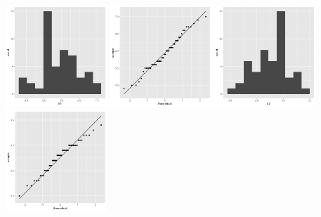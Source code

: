 \begin{center}
	\includegraphics[width=1.5in]{I_2_X1_hist.png}
	\includegraphics[width=1.5in]{I_2_X1_qq.png}
	\includegraphics[width=1.5in]{I_2_X2_hist.png}
	\includegraphics[width=1.5in]{I_2_X2_qq.png}
\end{center}
